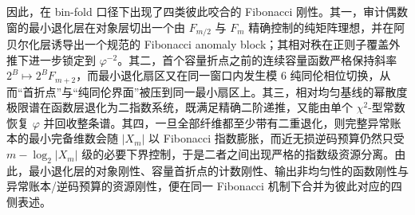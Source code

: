 \noindent
因此，在 bin-fold 口径下出现了四类彼此咬合的 Fibonacci 刚性。其一，审计偶数窗的最小退化层在对象层切出一个由 \(F_{m/2}\) 与 \(F_m\) 精确控制的纯矩阵理想，并在阿贝尔化层诱导出一个规范的 Fibonacci anomaly block；其相对秩在正则子覆盖外推下进一步锁定到 \(\varphi^{-2}\)。其二，首个容量折点之前的连续容量函数严格保持斜率 \(2^B\mapsto 2^BF_{m+2}\)，而最小退化扇区又在同一窗口内发生模 \(6\) 纯同伦相位切换，从而“首折点”与“纯同伦界面”被压到同一最小扇区上。其三，相对均匀基线的幂散度极限谱在函数层退化为二指数系统，既满足精确二阶递推，又能由单个 \(\chi^2\)-型常数恢复 \(\varphi\) 并回收整条谱。其四，一旦全部纤维都至少带有二重退化，则完整异常账本的最小完备维数会随 \(|X_m|\) 以 Fibonacci 指数膨胀，而近无损逆码预算仍然只受 \(m-\log_2|X_m|\) 级的必要下界控制，于是二者之间出现严格的指数级资源分离。由此，最小退化层的对象刚性、容量首折点的计数刚性、输出非均匀性的函数刚性与异常账本/逆码预算的资源刚性，便在同一 Fibonacci 机制下合并为彼此对应的四侧表述。

\endinput
